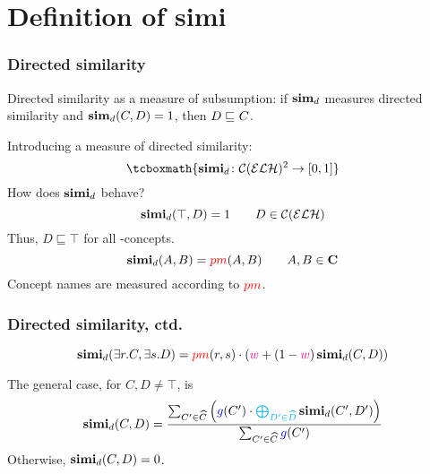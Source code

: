 \documentclass[smaller]{beamer}
\begin{document}
\section{Definition of simi}

\begin{frame}
  \frametitle{Directed similarity}
  \alert{Directed similarity} as a measure of subsumption:
  if \(\operatorname{\mathbf{sim}}_d\) measures directed similarity and \(\operatorname{\mathbf{sim}}_d(C,D) = 1\), then \(D \sqsubseteq_{\mathcal{}} C\).

  Introducing a measure of directed similarity:
  \begin{equation}
  \tcboxmath{\simi_d \colon \celh^2 \to [0,1]}
  \end{equation}
  How does \(\operatorname{\mathbf{simi}}_d\) behave?
  \begin{equation}
    \operatorname{\mathbf{simi}}_d(\top,D) = 1 \qquad D \in \mathcal{C}(\mathcal{ELH})
  \end{equation}
  Thus, \(D \sqsubseteq \top\) for all \elh-concepts.
  \begin{equation}
    \operatorname{\mathbf{simi}}_d(A,B) = \textcolor{red}{pm}(A,B) \qquad A,B \in \mathbf{C}
  \end{equation}
  Concept names are measured according to \(\textcolor{red}{pm}\).
\end{frame}

\begin{frame}
  \frametitle{Directed similarity, ctd.}
  \begin{equation}
    \operatorname{\mathbf{simi}}_d(\exists{}r.C,\exists{}s.D) =
    \textcolor{red}{pm}(r,s) \cdot 
    \left(\textcolor{magenta}{w} + 
    (1-\textcolor{magenta}{w})\operatorname{\mathbf{simi}}_d(C,D)\right)
  \end{equation}

  The general case, for \(C,D \ne \top\), is
  \begin{equation}
    \simi_d(C,D) =
    \frac{\sum_{C^\prime \in \atom{C}}\left(\myg(C^\prime) \cdot \textcolor{cyan}{\bigoplus_{D^\prime \in \atom{D}}} \simi_d(C^\prime, D^\prime)\right)}%
    {\sum_{C^\prime \in \atom{C}}\myg(C^\prime)}
  \end{equation}
  Otherwise, \(\operatorname{\mathbf{simi}}_d(C,D) = 0\).
\end{frame}
\end{document}
